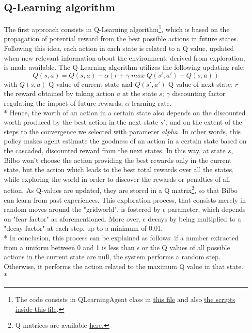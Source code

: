 \subsection{Q-Learning algorithm}
The first approach consists in Q-Learning algorithm\footnote{The code consists in QLearningAgent class in \href{https://github.com/moiraghif/DragonHunting/blob/master/Bilbo\%20World/agents.py}{this file} and also \href{https://github.com/moiraghif/DragonHunting/blob/master/Bilbo\%20World/Bilbo_q_learning.py}{the scripts inside this file}.}, which is based on the propagation of potential reward from the best possible actions in future states. Following this idea, each action in each state is related to a Q value, updated when new relevant information about the environment, derived from exploration, is made available. The Q-Learning algorithm utilizes the following updating rule:
$${\scriptstyle Q(s,a)=Q(s,a)+\alpha(r+\gamma\;max\;Q(s',a') - Q(s,a))}$$
with $Q(s,a)$ Q value of current state and $Q(s',a')$ Q value of next state; $r$ the reward obtained by taking action $a$ at the state $s$; $\gamma$ discounting factor regulating the impact of future rewards; $\alpha$ learning rate.\\*
Hence, the worth of an action in a certain state also depends on the discounted worth produced by the best action in the next state $s'$, and on the extent of the steps to the convergence we selected with parameter $alpha$. In other words, this policy makes agent estimate the goodness of an action in a certain state based on the cascaded, discounted reward from the next states. In this way, at state $s$, Bilbo won't choose the action providing the best rewards only in the current state, but the action which leads to the best total rewards over all the states, while exploring the world in order to discover the rewards or penalties of all action. As Q-values are updated, they are stored in a Q matrix\footnote{Q-matrices are available \href{https://github.com/moiraghif/DragonHunting/tree/master/Bilbo\%20World/models}{here.}}, so that Bilbo can learn from past experiences. This exploration process, that consists merely in random moves around the "gridworld", is fostered by $\epsilon$ parameter, which depends on "fear factor" as aforementioned. More over, $\epsilon$ decays by being multiplied to a "decay factor" at each step, up to a minimum of 0.01.\\*
In conclusion, this process can be explained as follows: if a number extracted from a uniform between 0 and 1 is less than $\epsilon$ or the Q values of all possible actions in the current state are null, the system performs a random step. Otherwise, it performs the action related to the maximum Q value in that state.\\*

